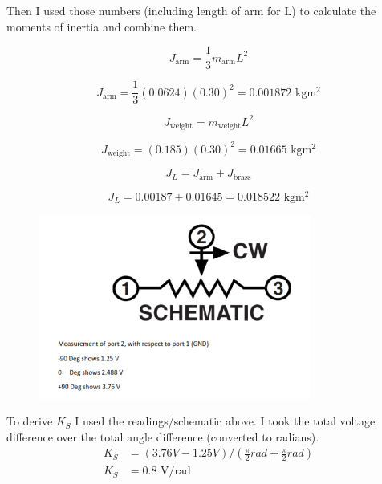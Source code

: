 \documentclass{article}
\begin{document}
Then I used those numbers (including length of arm for L) to calculate the moments of inertia and combine them.

\begin{equation}
    J_{\text{arm}} = \frac{1}{3} m_{\text{arm}} L^2
\end{equation}

\begin{equation}
    J_{\text{arm}} = \frac{1}{3} (0.0624) (0.30)^2 = 0.001872 \text{ kg}\text{m}^2
\end{equation}

\begin{equation}
    J_{\text{weight}} = m_{\text{weight}} L^2
\end{equation}

\begin{equation}
    J_{\text{weight}} = (0.185) (0.30)^2 = 0.01665 \text{ kg}\text{m}^2
\end{equation}

\begin{equation}
    J_L = J_{\text{arm}} + J_{\text{brass}}
\end{equation}

\begin{equation}
    J_L = 0.00187 + 0.01645 = 0.018522 \text{ kg}\text{m}^2
\end{equation}

\begin{figure}[H]
    \centering
    \includegraphics[width=0.8\textwidth]{potentiometerSpec.png}
\end{figure}

To derive $K_S$ I used the readings/schematic above.
I took the total voltage difference over the total angle difference (converted to radians).
\begin{align}
    K_S&=(3.76V-1.25V)/(\frac{\pi}{2}rad+\frac{\pi}{2}rad) \\
    K_S&=0.8\text{ V/rad}
\end{align}
    
\end{document}
